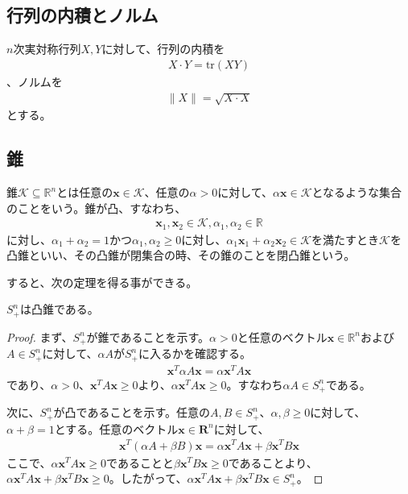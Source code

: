 \subsection{行列の内積とノルム}
$n$次実対称行列$X, Y$に対して、行列の内積を
\begin{align*}
  X \cdot Y = \mathrm{tr}(X Y)
\end{align*}
、ノルムを
\begin{align*}
  \|X\| = \sqrt{X \cdot X}
\end{align*}
とする。

\subsection{錐}
錐$\mathcal{K} \subseteq \mathbb{R}^n$とは任意の$\mathbf{x} \in \mathcal{K}$、任意の$\alpha > 0$に対して、$\alpha \mathbf{x} \in \mathcal{K}$となるような集合のことをいう。錐が凸、すなわち、
\begin{align*}
  \mathbf{x}_1, \mathbf{x}_2 \in \mathcal{K}, \alpha_1, \alpha_2 \in \mathbb{R}
\end{align*}
に対し、$\alpha_1 + \alpha_2 = 1$かつ$\alpha_1, \alpha_2 \geq 0$に対し、$\alpha_1 \mathbf{x}_1 + \alpha_2 \mathbf{x}_2 \in \mathcal{K}$を満たすとき$\mathcal{K}$を凸錐といい、その凸錐が閉集合の時、その錐のことを閉凸錐という。

すると、次の定理を得る事ができる。
\begin{theorem*}
  $S_+^n$は凸錐である。
\end{theorem*}

\begin{proof}
  まず、$S_+^n$が錐であることを示す。$\alpha > 0$と任意のベクトル$\mathbf{x} \in \mathbb{R}^n$および$A \in S_+^n$に対して、$\alpha A$が$S_+^n$に入るかを確認する。
  \begin{align*}
    \mathbf{x}^T \alpha A \mathbf{x} = \alpha \mathbf{x}^T A \mathbf{x}
  \end{align*}
  であり、$\alpha > 0$、$\mathbf{x}^T A \mathbf{x} \geq 0$より、$\alpha \mathbf{x}^T A \mathbf{x} \geq 0$。すなわち$\alpha A \in S_+^n$である。

  次に、$S_+^n$が凸であることを示す。任意の$A, B \in S_+^n$、$\alpha, \beta \geq 0$に対して、$\alpha + \beta = 1$とする。任意のベクトル$\mathbf{x} \in \mathbf{R}^n$に対して、
  \begin{align*}
    \mathbf{x}^T (\alpha A + \beta B) \mathbf{x} = \alpha \mathbf{x}^T A \mathbf{x} + \beta \mathbf{x}^T B \mathbf{x}
  \end{align*}
  ここで、$\alpha \mathbf{x}^T A \mathbf{x} \geq 0$であることと$\beta \mathbf{x}^T B \mathbf{x} \geq 0$であることより、$\alpha \mathbf{x}^T A \mathbf{x} + \beta \mathbf{x}^T B \mathbf{x} \geq 0$。したがって、$\alpha \mathbf{x}^T A \mathbf{x} + \beta \mathbf{x}^T B \mathbf{x} \in S_+^n$。
\end{proof}


